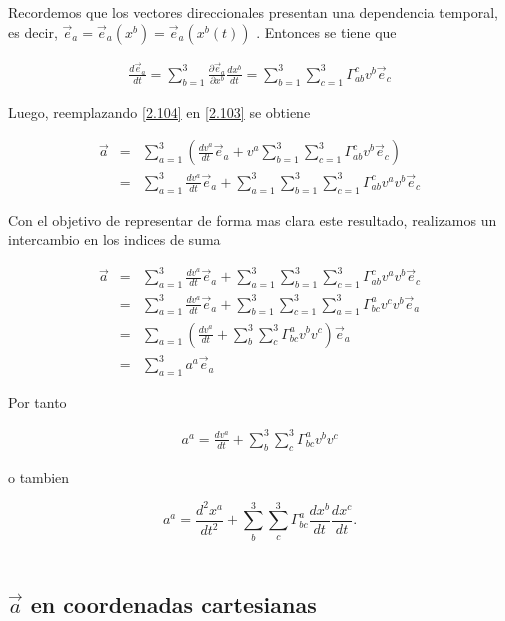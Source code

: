 \documentclass[12pt]{report}
\begin{document}
Recordemos que los vectores direccionales presentan una dependencia temporal, es decir, $\vec{e}_a = \vec{e}_a (x^b)= \vec{e}_a (x^b(t))$ . Entonces  se tiene que 

\begin{eqnarray} \label{2.104}
\frac{d\vec{e}_a}{dt} = \sum_{b=1}^3 \frac{\partial \vec{e}_a}{\partial x^b} \frac{dx^b}{dt}= \sum_{b=1}^3 \sum_{c=1}^3 \Gamma_{ab}^c v^b \vec{e}_c
\end{eqnarray}

Luego, reemplazando \eqref{2.104} en \eqref{2.103} se obtiene

\begin{eqnarray} \nonumber
\vec{a} &=& \sum_{a=1}^3 \left( \frac{dv^a}{dt}\vec{e}_a + v^a \sum_{b=1}^3 \sum_{c=1}^3 \Gamma_{ab}^c v^b \vec{e}_c  \right) \\ \nonumber
&=& \sum_{a=1}^3  \frac{dv^a}{dt}\vec{e}_a + \sum_{a=1}^3 \sum_{b=1}^3 \sum_{c=1}^3 \Gamma_{ab}^c v^a v^b \vec{e}_c 
\end{eqnarray}


Con el objetivo de representar de forma mas clara este resultado, realizamos un intercambio en los indices de suma

\begin{eqnarray} \nonumber
\vec{a} &=& \sum_{a=1}^3  \frac{dv^a}{dt}\vec{e}_a + \sum_{a=1}^3 \sum_{b=1}^3 \sum_{c=1}^3 \Gamma_{ab}^c v^a v^b \vec{e}_c  \\ \nonumber
&=& \sum_{a=1}^3  \frac{dv^a}{dt}\vec{e}_a + \sum_{b=1}^3 \sum_{c=1}^3 \sum_{a=1}^3 \Gamma_{bc}^a v^c v^b \vec{e}_a \\ \nonumber
&=& \sum_{a=1} \left( \frac{dv^a}{dt} + \sum_{b}^3 \sum_{c}^3 \Gamma_{bc}^a v^b v^c \right) \vec{e}_a \\ \label{2.105}
&=& \sum_{a=1}^3 a^a \vec{e}_a 
\end{eqnarray}

Por tanto

\begin{eqnarray} \label{2.106}
a^a = \frac{dv^a}{dt} + \sum_{b}^3 \sum_{c}^3 \Gamma_{bc}^a v^b v^c
\end{eqnarray}


o tambien

\begin{equation} \label{2.107}
a^a = \frac{d^2x^a}{dt^2} + \sum_{b}^3 \sum_{c}^3 \Gamma_{bc}^a \frac{dx^b}{dt} \frac{dx^c}{dt}.
\end{equation}
\\

\subsection{$\vec{a}$ en coordenadas cartesianas}
\end{document}
